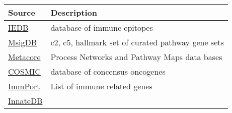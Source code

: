 \documentclass[
]{book}
\begin{document}
\begin{longtable}[]{@{}ll@{}}
\toprule
\begin{minipage}[b]{0.21\columnwidth}\raggedright
Source\strut
\end{minipage} & \begin{minipage}[b]{0.73\columnwidth}\raggedright
Description\strut
\end{minipage}\tabularnewline
\midrule
\endhead
\begin{minipage}[t]{0.21\columnwidth}\raggedright
\href{https://www.iedb.org/}{IEDB}\strut
\end{minipage} & \begin{minipage}[t]{0.73\columnwidth}\raggedright
database of immune epitopes\strut
\end{minipage}\tabularnewline
\begin{minipage}[t]{0.21\columnwidth}\raggedright
\href{http://software.broadinstitute.org/gsea/msigdb/index.jsp}{MsigDB}\strut
\end{minipage} & \begin{minipage}[t]{0.73\columnwidth}\raggedright
c2, c5, hallmark set of curated pathway gene sets\strut
\end{minipage}\tabularnewline
\begin{minipage}[t]{0.21\columnwidth}\raggedright
\href{}{Metacore}\strut
\end{minipage} & \begin{minipage}[t]{0.73\columnwidth}\raggedright
Process Networks and Pathway Maps data bases\strut
\end{minipage}\tabularnewline
\begin{minipage}[t]{0.21\columnwidth}\raggedright
\href{https://cancer.sanger.ac.uk/census}{COSMIC}\strut
\end{minipage} & \begin{minipage}[t]{0.73\columnwidth}\raggedright
database of concensus oncogenes\strut
\end{minipage}\tabularnewline
\begin{minipage}[t]{0.21\columnwidth}\raggedright
\href{https://www.immport.org/home}{ImmPort}\strut
\end{minipage} & \begin{minipage}[t]{0.73\columnwidth}\raggedright
List of immune related genes\strut
\end{minipage}\tabularnewline
\begin{minipage}[t]{0.21\columnwidth}\raggedright
\href{https://www.innatedb.com/}{InnateDB}\strut
\end{minipage} & \begin{minipage}[t]{0.73\columnwidth}\raggedright

\end{minipage}
\end{longtable}
\end{document}
